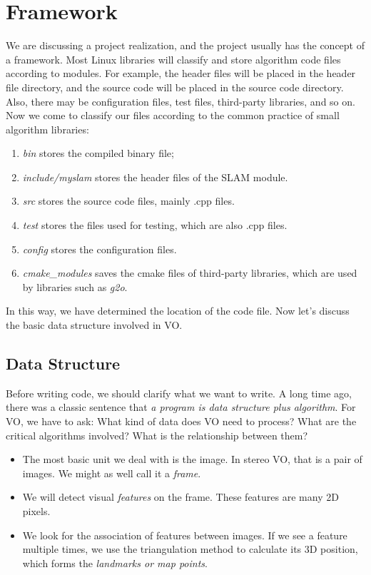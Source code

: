 \section{Framework}
We are discussing a project realization, and the project usually has the concept of a framework. Most Linux libraries will classify and store algorithm code files according to modules. For example, the header files will be placed in the header file directory, and the source code will be placed in the source code directory. Also, there may be configuration files, test files, third-party libraries, and so on. Now we come to classify our files according to the common practice of small algorithm libraries:

\begin{enumerate}
	\item \textit{bin} stores the compiled binary file;
	\item \textit{include/myslam} stores the header files of the SLAM module. 
	\item \textit{src} stores the source code files, mainly .cpp files.
	\item \textit{test} stores the files used for testing, which are also .cpp files.
	\item \textit{config} stores the configuration files.
	\item \textit{cmake\_modules} saves the cmake files of third-party libraries, which are used by libraries such as \textit{g2o}.
\end{enumerate}

In this way, we have determined the location of the code file. Now let's discuss the basic data structure involved in VO.

\subsection{Data Structure}
Before writing code, we should clarify what we want to write. A long time ago, there was a classic sentence that \textit{a program is data structure plus algorithm}. For VO, we have to ask: What kind of data does VO need to process? What are the critical algorithms involved? What is the relationship between them?

\begin{itemize}
	\item The most basic unit we deal with is the image. In stereo VO, that is a pair of images. We might as well call it a \textit{frame}.
	\item We will detect visual \textit{features} on the frame. These features are many 2D pixels.
	\item We look for the association of features between images. If we see a feature multiple times, we use the triangulation method to calculate its 3D position, which forms the \textit{landmarks or map points}.
\end{itemize}

